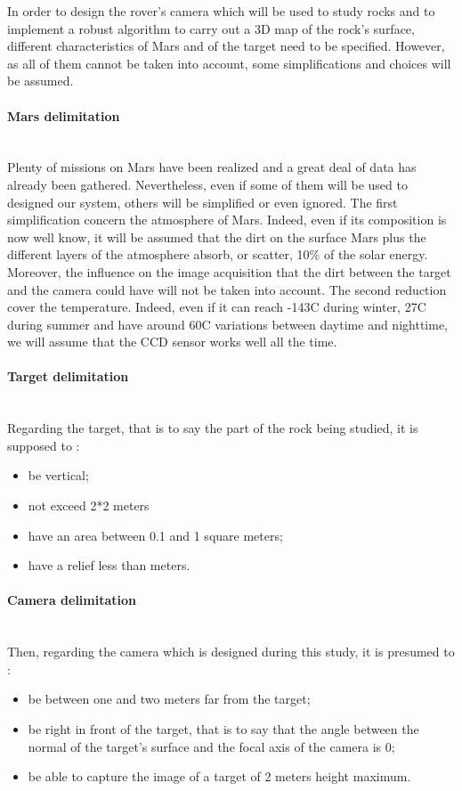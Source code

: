 In order to design the rover's camera which will be used to study rocks and to implement a robust algorithm to carry out a 3D map of the rock's surface, different characteristics of Mars and of the target need to be specified. However, as all of them cannot be taken into account, some simplifications and choices will be assumed.

\paragraph*{Mars delimitation}
~\\
Plenty of missions on Mars have been realized and a great deal of data has already been gathered. Nevertheless, even if some of them will be used to designed our system, others will be simplified or even ignored.
The first simplification concern the atmosphere of Mars. Indeed, even if its composition is now well know, it will be assumed that the dirt on the surface Mars plus the different layers of the atmosphere absorb, or scatter, 10\% of the solar energy. Moreover, the influence on the image acquisition that the dirt between the target and the camera could have will not be taken into account.
The second reduction cover the temperature. Indeed, even if it can reach -143\textdegree C during winter, 27\textdegree C during summer and have around 60\textdegree C variations between daytime and nighttime\cite{wiki:temperature}, we will assume that the CCD sensor works well all the time.

\paragraph*{Target delimitation}
~\\
Regarding the target, that is to say the part of the rock being studied, it is supposed to :
\begin{itemize}
\item be vertical;
\item not exceed 2*2 meters
\item have an area between 0.1 and 1 square meters;
\item have a relief less than  meters.
\end{itemize}

\paragraph*{Camera delimitation}
~\\
Then, regarding the camera which is designed during this study, it is presumed to :
\begin{itemize}
\item be between one and two meters far from the target;
\item be right in front of the target, that is to say that the angle between the normal of the target's surface and the focal axis of the camera is 0\textdegree;
\item be able to capture the image of a target of 2 meters height maximum.
\end{itemize}

